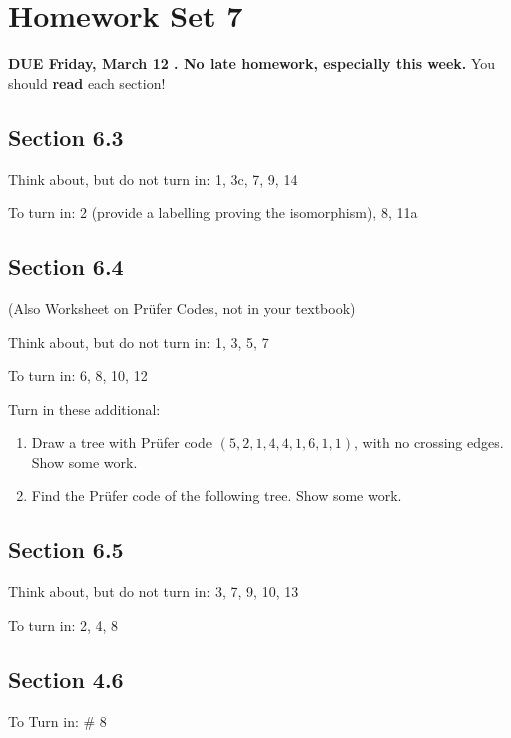 \documentclass[11pt]{amsart}
\newcommand{\be}{\begin{enumerate}}
\newcommand{\ee}{\end{enumerate}}
\begin{document}
\section*{Homework Set 7}

{\bf DUE Friday, March 12 . No late homework, especially this week.}
You should {\bf read} each section!

\subsection*{Section 6.3}

Think about, but do not turn in: 1, 3c, 7, 9, 14

To turn in:  2 (provide a labelling proving the isomorphism), 8, 11a

\subsection*{Section 6.4} 

(Also Worksheet on Pr\"{u}fer Codes, not in your textbook)

Think about, but do not turn in: 1, 3, 5, 7

To turn in: 6, 8, 10, 12

Turn in these additional:

\be
\item Draw a tree with Pr\"ufer code $(5,2,1,4,4,1,6,1,1)$, with no crossing edges. Show some work.
\item Find the Pr\"{u}fer code of the following tree. Show some work.

\ee

\subsection*{Section 6.5} 

Think about, but do not turn in: 3, 7, 9, 10, 13

To turn in:  2, 4, 8

\subsection*{Section 4.6}

To Turn in: \# 8
\end{document}
